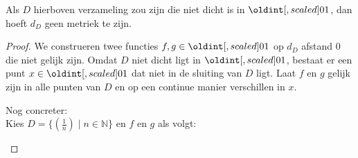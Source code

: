 \documentclass[main.tex]{subfiles}
\begin{document}
\begin{tvb}
  Als $D$ hierboven verzameling zou zijn die niet dicht is in $\interval{0}{1}$, dan hoeft $d_{D}$ geen metriek te zijn.

  \begin{proof}
    We construeren twee functies $f,g \in \interval{0}{1}$ op $d_{D}$ afstand $0$ die niet gelijk zijn.
    Omdat $D$ niet dicht ligt in $\interval{0}{1}$, bestaat er een punt $x\in \interval{0}{1}$ dat niet in de sluiting van $D$ ligt.
    Laat $f$ en $g$ gelijk zijn in alle punten van $D$ en op een continue manier verschillen in $x$.

    \noindent Nog concreter:\\
    Kies $D = \{ \left(\frac{1}{n}\right) \mid n\in\mathbb{N} \}$ en $f$ en $g$ als volgt:

    \noindent
    \begin{minipage}{.45\textwidth}
      \begin{figure}[H]
        \centering
      \end{figure}
    \end{minipage}
    \begin{minipage}{.45\textwidth}


\end{minipage}
\end{proof}
\end{tvb}
\end{document}
